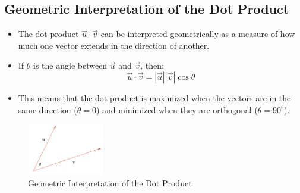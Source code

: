 \subsection{Geometric Interpretation of the Dot Product}
\begin{itemize}
    \item The dot product \(\vec{u} \cdot \vec{v}\) can be interpreted geometrically as a measure of how much one vector extends in the direction of another.
    \item If \(\theta\) is the angle between \(\vec{u}\) and \(\vec{v}\), then:
    \[ \vec{u} \cdot \vec{v} = |\vec{u}||\vec{v}|\cos\theta \]
    \item This means that the dot product is maximized when the vectors are in the same direction (\(\theta = 0\)) and minimized when they are orthogonal (\(\theta = 90^\circ\)).
\end{itemize}
\begin{figure}
    \centering
    \includegraphics[width=0.3\textwidth]{pics/vector5.png}
    \caption{Geometric Interpretation of the Dot Product}
    \label{fig:dot_product}
\end{figure}

